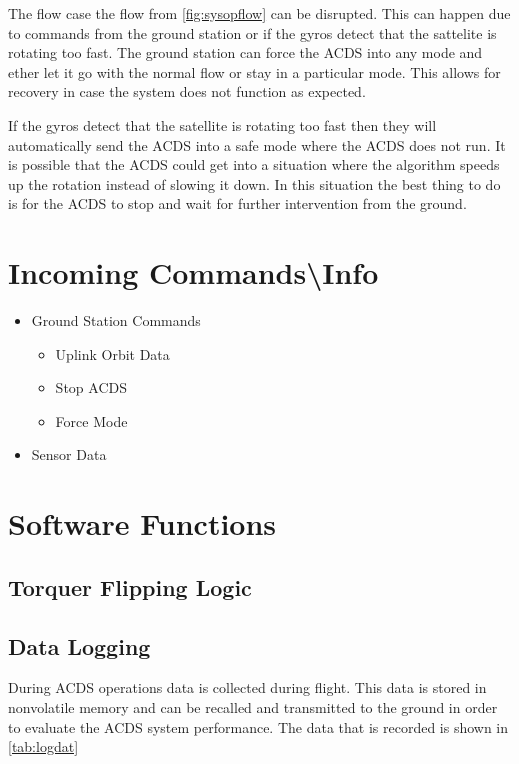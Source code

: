 The flow case the flow from \cref{fig:sysopflow} can be disrupted. This can happen due to commands from the ground station or if the gyros detect that the sattelite is rotating too fast. The ground station can force the \ac{ACDS} into any mode and ether let it go with the normal flow or stay in a particular mode. This allows for recovery in case the system does not function as expected.

If the gyros detect that the satellite is rotating too fast then they will automatically send the \ac{ACDS} into a safe mode where the \ac{ACDS} does not run. It is possible that the \ac{ACDS} could get into a situation where the algorithm speeds up the rotation instead of slowing it down. In this situation the best thing to do is for the \ac{ACDS} to stop and wait for further intervention from the ground.

\section{Incoming Commands\textbackslash Info}

\begin{itemize}
    \item Ground Station Commands
        \begin{itemize}
            \item Uplink Orbit Data
            \item Stop \ac{ACDS}
            \item Force Mode
        \end{itemize}
    \item Sensor Data
\end{itemize}

\section{Software Functions}

\subsection{Torquer Flipping Logic}

\subsection{Data Logging}

During \ac{ACDS} operations data is collected during flight. This data is stored in nonvolatile memory and can be recalled and transmitted to the ground in order to evaluate the \ac{ACDS} system performance. The data that is recorded is shown in \cref{tab:logdat}

